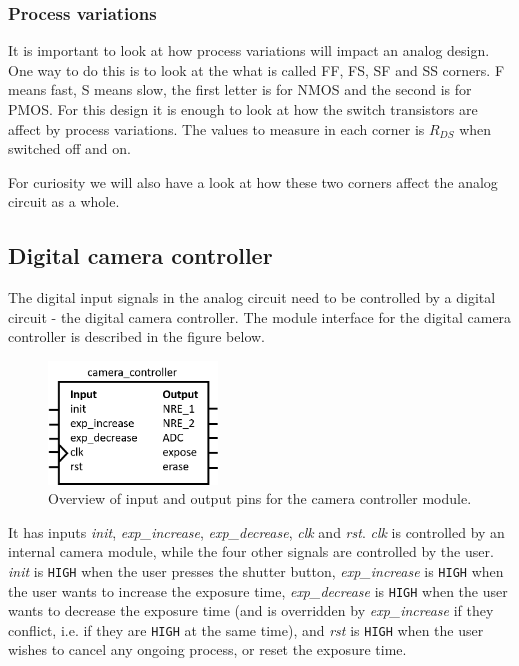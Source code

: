 \subsubsection{Process variations}

It is important to look at how process variations will impact an analog design. One way to do this is to look at the what is called FF, FS, SF and SS corners. F means fast, S means slow, the first letter is for NMOS and the second is for PMOS. For this design it is enough to look at how the switch transistors are affect by process variations. The values to measure in each corner is $R_{DS}$ when switched off and on.

For curiosity we will also have a look at how these two corners affect the analog circuit as a whole.

\subsection{Digital camera controller}
The digital input signals in the analog circuit need to be controlled by a digital circuit - the digital camera controller. The module interface for the digital camera controller is described in the figure below.

\begin{figure}[H]
    \centering
    \includegraphics[width=0.4\textwidth]{graphs/camera_controller_pinout.png}
    \caption{Overview of input and output pins for the camera controller module.}
    \label{fig:io}
\end{figure}

It has inputs \emph{init}, \emph{exp\_increase}, \emph{exp\_decrease}, \emph{clk} and \emph{rst}. \emph{clk} is controlled by an internal camera module, while the four other signals are controlled by the user. \emph{init} is \verb|HIGH| when the user presses the shutter button, \emph{exp\_increase} is \verb|HIGH| when the user wants to increase the exposure time, \emph{exp\_decrease} is \verb|HIGH| when the user wants to decrease the exposure time (and is overridden by \emph{exp\_increase} if they conflict, i.e. if they are \verb|HIGH| at the same time), and \emph{rst} is \verb|HIGH| when the user wishes to cancel any ongoing process, or reset the exposure time.

